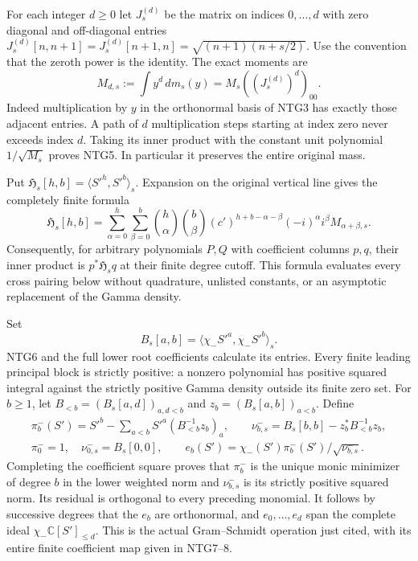 \documentclass[11pt,a4paper]{article}
\begin{document}
For each integer $d\ge0$ let $J^{(d)}_s$ be the matrix on indices
$0,\ldots,d$ with zero diagonal and off-diagonal entries
$J_s^{(d)}[n,n+1]=J_s^{(d)}[n+1,n]=\sqrt{(n+1)(n+s/2)}$.
Use the convention that the zeroth power is the identity.
The exact moments are
\[
 M_{d,s}:=\int y^d\,dm_s(y)=M_s((J_s^{(d)})^d)_{00}.
                                                               \tag{NTG5}
\]
Indeed multiplication by $y$ in the orthonormal basis of NTG3
has exactly those adjacent entries. A path of $d$ multiplication
steps starting at index zero never exceeds index $d$.
Taking its inner product with the constant unit polynomial
$1/\sqrt{M_s}$ proves NTG5. In particular it preserves the
entire original mass.

Put $\mathfrak H_s[h,b]=\langle S'^h,S'^b\rangle_s$. Expansion
on the original vertical line gives the completely finite formula
\[
 \mathfrak H_s[h,b]
 =\sum_{\alpha=0}^{h}\sum_{\beta=0}^{b}
 \binom h\alpha\binom b\beta
 (c')^{h+b-\alpha-\beta}(-i)^\alpha i^\beta
 M_{\alpha+\beta,s}.
                                                               \tag{NTG6}
\]
Consequently, for arbitrary polynomials $P,Q$ with coefficient
columns $p,q$, their inner product is $p^*\mathfrak H_s q$
at their finite degree cutoff. This formula evaluates every
cross pairing below without quadrature, unlisted constants, or
an asymptotic replacement of the Gamma density.

Set
\[
 B_s[a,b]=\langle\chi_-S'^a,\chi_-S'^b\rangle_s.
                                                               \tag{NTG7}
\]
NTG6 and the full lower root coefficients calculate its entries.
Every finite leading principal block is strictly positive:
a nonzero polynomial has positive squared integral against the
strictly positive Gamma density outside its finite zero set.
For $b\ge1$, let $B_{<b}=(B_s[a,d])_{a,d<b}$ and
$z_b=(B_s[a,b])_{a<b}$. Define
\[
\begin{gathered}
 \pi_b^-(S')=S'^b-\sum_{a<b}S'^a(B_{<b}^{-1}z_b)_a,\qquad
 \nu_{b,s}^-=B_s[b,b]-z_b^*B_{<b}^{-1}z_b,\\
 \pi_0^-=1,\quad\nu_{0,s}^-=B_s[0,0],\qquad
 e_b(S')=\chi_-(S')\pi_b^-(S')/\sqrt{\nu_{b,s}^-}.
\end{gathered}                                                    \tag{NTG8}
\]
Completing the coefficient square proves that $\pi_b^-$ is
the unique monic minimizer of degree $b$ in the lower weighted
norm and $\nu_{b,s}^-$ is its strictly positive squared norm.
Its residual is orthogonal to every preceding monomial. It
follows by successive degrees that the $e_b$ are orthonormal,
and $e_0,\ldots,e_d$ span the complete ideal
$\chi_-\mathbb C[S']_{\le d}$. This is the actual Gram--Schmidt
operation just cited, with its entire finite coefficient map
given in NTG7--8.
\end{document}
